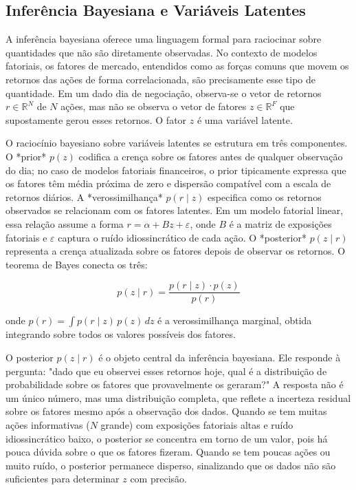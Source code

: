 \subsection{Inferência Bayesiana e Variáveis Latentes}

A inferência bayesiana oferece uma linguagem formal para raciocinar sobre quantidades que não são diretamente observadas. No contexto de modelos fatoriais, os fatores de mercado, entendidos como as forças comuns que movem os retornos das ações de forma correlacionada, são precisamente esse tipo de quantidade. Em um dado dia de negociação, observa-se o vetor de retornos $r \in \mathbb{R}^N$ de $N$ ações, mas não se observa o vetor de fatores $z \in \mathbb{R}^F$ que supostamente gerou esses retornos. O fator $z$ é uma variável latente.

O raciocínio bayesiano sobre variáveis latentes se estrutura em três componentes. O *prior* $p(z)$ codifica a crença sobre os fatores antes de qualquer observação do dia; no caso de modelos fatoriais financeiros, o prior tipicamente expressa que os fatores têm média próxima de zero e dispersão compatível com a escala de retornos diários. A *verossimilhança* $p(r \mid z)$ especifica como os retornos observados se relacionam com os fatores latentes. Em um modelo fatorial linear, essa relação assume a forma $r = \alpha + Bz + \varepsilon$, onde $B$ é a matriz de exposições fatoriais e $\varepsilon$ captura o ruído idiossincrático de cada ação. O *posterior* $p(z \mid r)$ representa a crença atualizada sobre os fatores depois de observar os retornos. O teorema de Bayes conecta os três:

$$p(z \mid r) = \frac{p(r \mid z) \cdot p(z)}{p(r)}$$

onde $p(r) = \int p(r \mid z) \, p(z) \, dz$ é a verossimilhança marginal, obtida integrando sobre todos os valores possíveis dos fatores.

O posterior $p(z \mid r)$ é o objeto central da inferência bayesiana. Ele responde à pergunta: "dado que eu observei esses retornos hoje, qual é a distribuição de probabilidade sobre os fatores que provavelmente os geraram?" A resposta não é um único número, mas uma distribuição completa, que reflete a incerteza residual sobre os fatores mesmo após a observação dos dados. Quando se tem muitas ações informativas ($N$ grande) com exposições fatoriais altas e ruído idiossincrático baixo, o posterior se concentra em torno de um valor, pois há pouca dúvida sobre o que os fatores fizeram. Quando se tem poucas ações ou muito ruído, o posterior permanece disperso, sinalizando que os dados não são suficientes para determinar $z$ com precisão.

